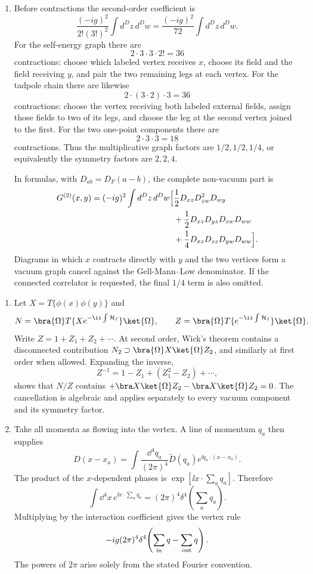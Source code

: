 \begin{enumerate}
\begin{enumerate}
\item
Before contractions the second-order coefficient is
\[
 \frac{(-ig)^2}{2!(3!)^2}\int d^Dz\,d^Dw
 =\frac{(-ig)^2}{72}\int d^Dz\,d^Dw.
\]
For the self-energy graph there are
\[
 2\cdot3\cdot3\cdot2!=36
\]
contractions: choose which labeled vertex receives \(x\), choose its
field and the field receiving \(y\), and pair the two remaining legs at
each vertex.  For the tadpole chain there are likewise
\[
 2\cdot(3\cdot2)\cdot3=36
\]
contractions: choose the vertex receiving both labeled external fields,
assign those fields to two of its legs, and choose the leg at the second
vertex joined to the first.  For the two one-point components there are
\[
 2\cdot3\cdot3=18
\]
contractions.  Thus the multiplicative graph factors are
\(1/2,1/2,1/4\), or equivalently the symmetry factors are
\(2,2,4\).

In formulas, with \(D_{ab}=D_F(a-b)\), the complete non-vacuum part is
\[
\begin{split}
 G^{(2)}(x,y)=(-ig)^2\int d^Dz\,d^Dw\Bigl[
 &\frac12D_{xz}D_{zw}^2D_{wy}\\
 &+\frac12D_{xz}D_{yz}D_{zw}D_{ww}\\
 &+\frac14D_{xz}D_{zz}D_{yw}D_{ww}\Bigr].
\end{split}
\]
Diagrams in which \(x\) contracts directly with \(y\) and the two
vertices form a vacuum graph cancel against the Gell-Mann--Low
denominator.  If the connected correlator is requested, the final
\(1/4\) term is also omitted.
\end{enumerate}

\begin{enumerate}
\item
Let \(X=T\{\phi(x)\phi(y)\}\) and
\[
 N=\bra{\Omega}T\{Xe^{-\ii\int\mathcal H_I}\}\ket{\Omega},\qquad
 Z=\bra{\Omega}T\{e^{-\ii\int\mathcal H_I}\}\ket{\Omega}.
\]
Write \(Z=1+Z_1+Z_2+\cdots\).  At second order, Wick's theorem contains a
disconnected contribution \(N_2\supset
\bra{\Omega}X\ket{\Omega}Z_2\), and similarly at first order when
allowed.  Expanding the inverse,
\[
 Z^{-1}=1-Z_1+(Z_1^2-Z_2)+\cdots,
\]
shows that \(N/Z\) contains
\(+\bra X\ket{\Omega}Z_2-\bra X\ket{\Omega}Z_2=0\).
The cancellation is algebraic and applies separately to every vacuum
component and its symmetry factor.
\item
Take all momenta as flowing into the vertex.  A line of momentum \(q_a\)
then supplies
\[
 D(x-x_a)=\int\frac{\dd^4q_a}{(2\pi)^4}
 \widetilde D(q_a)e^{\ii q_a\cdot(x-x_a)}.
\]
The product of the \(x\)-dependent phases is
\(\exp[\ii x\cdot\sum_a q_a]\).  Therefore
\[
 \int \dd^4x\,e^{\ii x\cdot\sum_aq_a}
 =(2\pi)^4\delta^4\!\left(\sum_aq_a\right).
\]
Multiplying by the interaction coefficient gives the vertex rule
\[
 -ig(2\pi)^4\delta^4\!\left(\sum_{\rm in}q
 -\sum_{\rm out}q\right).
\]
The powers of \(2\pi\) arise solely from the stated Fourier convention.
\end{enumerate}


\end{enumerate}
